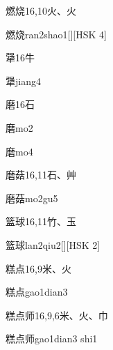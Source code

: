 \begin{entry}{燃烧}{16,10}{⽕、⽕}
  \begin{phonetics}{燃烧}{ran2shao1}[][HSK 4]
  \end{phonetics}
\end{entry}

\begin{entry}{犟}{16}{⽜}
  \begin{phonetics}{犟}{jiang4}
  \end{phonetics}
\end{entry}

\begin{entry}{磨}{16}{⽯}
  \begin{phonetics}{磨}{mo2}
  \end{phonetics}
  \begin{phonetics}{磨}{mo4}
  \end{phonetics}
\end{entry}

\begin{entry}{磨菇}{16,11}{⽯、⾋}
  \begin{phonetics}{磨菇}{mo2gu5}
  \end{phonetics}
\end{entry}

\begin{entry}{篮球}{16,11}{⽵、⽟}
  \begin{phonetics}{篮球}{lan2qiu2}[][HSK 2]
  \end{phonetics}
\end{entry}

\begin{entry}{糕点}{16,9}{⽶、⽕}
  \begin{phonetics}{糕点}{gao1dian3}
  \end{phonetics}
\end{entry}

\begin{entry}{糕点师}{16,9,6}{⽶、⽕、⼱}
  \begin{phonetics}{糕点师}{gao1dian3 shi1}
  \end{phonetics}
\end{entry}

